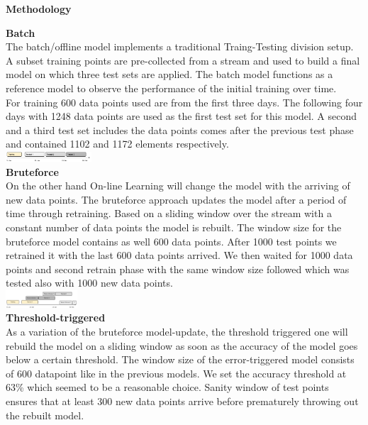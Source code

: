 \begin{center} \textbf{\huge Methodology} \end{center}
\textbf{\large Batch}\\
The batch/offline model implements a traditional Traing-Testing division setup. A subset training points are pre-collected from a stream and used to build a final model on which three test sets are applied. The batch model functions as a reference model to observe the performance of the initial training over time. \\
For training 600 data points used are from the first three days. The following four days with 1248 data points are used as the first test set for this model. A second and a third test set includes the data points comes after the previous test phase and contained 1102 and 1172 elements respectively.\\
\includegraphics[width=0.24\textwidth]{./time_models/OfflineModel.png}\\
\textbf{\large Bruteforce}\\
On the other hand On-line Learning will change the model with the arriving of new data points.
The bruteforce approach updates the model after a period of time through retraining. Based on a sliding window over the stream with a constant number of data points
the model is rebuilt. The window size for the bruteforce model contains as well 600 data points. After 1000 test points we retrained it with the last 600 data points arrived. We then waited for 1000 data points and second retrain phase with the same window size followed which was tested also with 1000 new data points.\\
\includegraphics[width=0.2\textwidth]{./time_models/BruteforceModel}\\
\textbf{\large Threshold-triggered}\\
As a variation of the bruteforce model-update, the threshold triggered one will rebuild the model on a sliding window as soon as the accuracy of the model goes below a certain threshold. The window size of the error-triggered model consists of  600 datapoint like in the previous models. We set the accuracy threshold at 63\% which seemed to be a reasonable choice. Sanity window of test points ensures that at least 300 new data points arrive before prematurely throwing out the rebuilt model.\\
